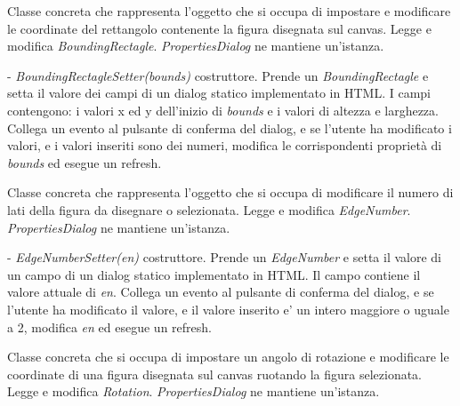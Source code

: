 Classe concreta che rappresenta l'oggetto che si occupa di impostare e modificare le coordinate del rettangolo contenente la figura disegnata sul canvas.
Legge e modifica \textit{BoundingRectagle}.
\textit{PropertiesDialog} ne mantiene un'istanza.
\begin{elencopuntato}[\subsubsecindent]
\item[-] \textit{BoundingRectagleSetter(bounds)} costruttore. Prende un \textit{BoundingRectagle} e setta il valore dei campi di un dialog statico implementato in HTML. I campi contengono: i valori x ed y dell'inizio di \textit{bounds} e i valori di altezza e larghezza. Collega un evento al pulsante di conferma del dialog, e se l'utente ha modificato i valori, e i valori inseriti sono dei numeri, modifica le corrispondenti propriet\`a di \textit{bounds} ed esegue un refresh.
\end{elencopuntato}

Classe concreta che rappresenta l'oggetto che si occupa di modificare il numero di lati della figura da disegnare o selezionata.
Legge e modifica \textit{EdgeNumber}.
\textit{PropertiesDialog} ne mantiene un'istanza.
\begin{elencopuntato}[\subsubsecindent]
\item[-] \textit{EdgeNumberSetter(en)} costruttore. Prende un \textit{EdgeNumber} e setta il valore di un campo di un dialog statico implementato in HTML. Il campo contiene il valore attuale di \textit{en}. Collega un evento al pulsante di conferma del dialog, e se l'utente ha modificato il valore, e il valore inserito e' un intero maggiore o uguale a 2, modifica \textit{en} ed esegue un refresh.
\end{elencopuntato}

Classe concreta che si occupa di impostare un angolo di rotazione e modificare le coordinate di una figura disegnata sul canvas ruotando la figura selezionata.
Legge e modifica \textit{Rotation}.
\textit{PropertiesDialog} ne mantiene un'istanza.




